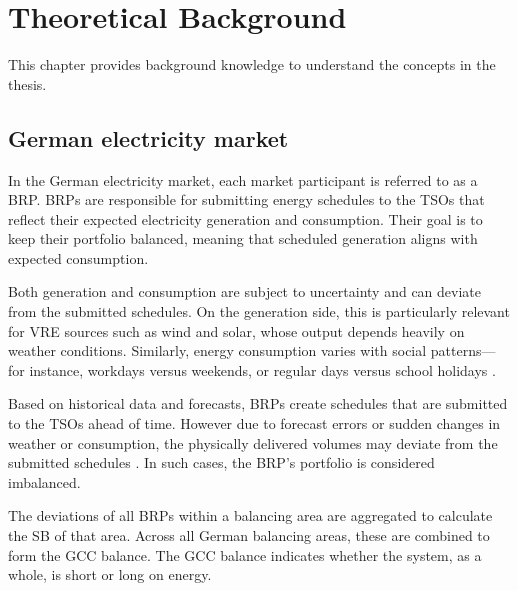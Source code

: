 \documentclass[class=scrbook, crop=false]{standalone}
\begin{document}


\chapter{Theoretical Background}
\label{Chapter::Theoretical_Background} %
This chapter provides background knowledge to understand the concepts in the thesis.

\section{German electricity market}
\label{Section::German_Electricity_Market}

In the German electricity market, each market participant is referred to as a \gls{BRP}. \gls{BRP}s are responsible for submitting energy schedules to the \gls{TSO}s that reflect their expected electricity generation and consumption.
Their goal is to keep their portfolio balanced, meaning that scheduled generation aligns with expected consumption.

Both generation and consumption are subject to uncertainty and can deviate from the submitted schedules. On the generation side, this is particularly relevant for \gls{VRE} sources such as wind and solar, whose output depends heavily on weather conditions. Similarly, energy consumption varies with social patterns—for instance, workdays versus weekends, or regular days versus school holidays \cite{neumannUsingWeatherData2023} \cite{el-azabSeasonalForecastingHourly2025}. 

Based on historical data and forecasts, \gls{BRP}s create schedules that are submitted to the \gls{TSO}s ahead of time. However due to forecast errors or sudden changes in weather or consumption, the physically delivered volumes may deviate from the submitted schedules \cite{InvestigationSystemImbalances}. In such cases, the \gls{BRP}’s portfolio is considered imbalanced. 

The deviations of all \gls{BRP}s within a balancing area are aggregated to calculate the \gls{SB} of that area. Across all German balancing areas, these are combined to form the \gls{GCC} balance. The  \gls{GCC} balance indicates whether the system, as a whole, is short or long on energy.
\end{document}
